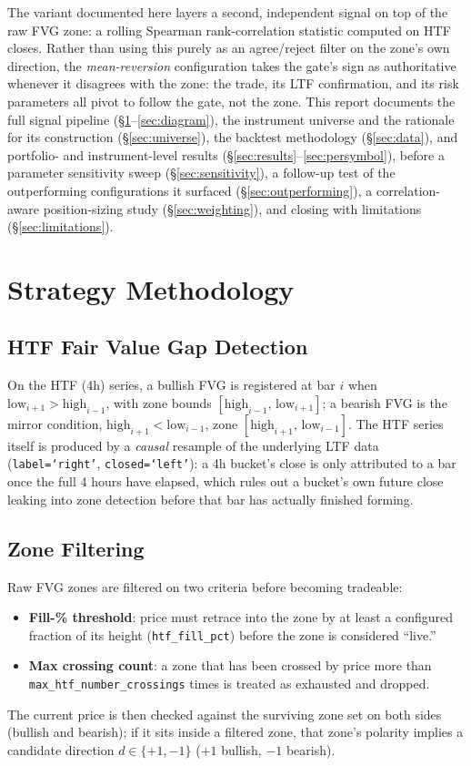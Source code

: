 \documentclass[11pt]{article}
\begin{document}
The variant documented here layers a second, independent signal on top of the raw FVG zone: a rolling
Spearman rank-correlation statistic computed on HTF closes. Rather than using this purely as an
agree/reject filter on the zone's own direction, the \emph{mean-reversion} configuration takes the
gate's sign as authoritative whenever it disagrees with the zone: the trade, its LTF confirmation, and
its risk parameters all pivot to follow the gate, not the zone. This report documents the full signal
pipeline (\S\ref{sec:methodology}--\ref{sec:diagram}), the instrument universe and the rationale for
its construction (\S\ref{sec:universe}), the backtest methodology (\S\ref{sec:data}), and portfolio-
and instrument-level results (\S\ref{sec:results}--\ref{sec:persymbol}), before a parameter sensitivity
sweep (\S\ref{sec:sensitivity}), a follow-up test of the outperforming configurations it surfaced
(\S\ref{sec:outperforming}), a correlation-aware position-sizing study (\S\ref{sec:weighting}), and
closing with limitations (\S\ref{sec:limitations}).

\section{Strategy Methodology}
\label{sec:methodology}

\subsection{HTF Fair Value Gap Detection}
On the HTF (4h) series, a bullish FVG is registered at bar $i$ when
$\mathrm{low}_{i+1} > \mathrm{high}_{i-1}$, with zone bounds $[\mathrm{high}_{i-1},\,\mathrm{low}_{i+1}]$;
a bearish FVG is the mirror condition, $\mathrm{high}_{i+1} < \mathrm{low}_{i-1}$, zone
$[\mathrm{high}_{i+1},\,\mathrm{low}_{i-1}]$. The HTF series itself is produced by a \emph{causal}
resample of the underlying LTF data (\texttt{label=`right'}, \texttt{closed=`left'}): a 4h bucket's
close is only attributed to a bar once the full 4 hours have elapsed, which rules out a bucket's own
future close leaking into zone detection before that bar has actually finished forming.

\subsection{Zone Filtering}
Raw FVG zones are filtered on two criteria before becoming tradeable:
\begin{itemize}[nosep]
  \item \textbf{Fill-\% threshold}: price must retrace into the zone by at least a configured
  fraction of its height (\texttt{htf\_fill\_pct}) before the zone is considered ``live.''
  \item \textbf{Max crossing count}: a zone that has been crossed by price more than
  \texttt{max\_htf\_number\_crossings} times is treated as exhausted and dropped.
\end{itemize}
The current price is then checked against the surviving zone set on both sides (bullish and bearish);
if it sits inside a filtered zone, that zone's polarity implies a candidate direction
$d\in\{+1,-1\}$ ($+1$ bullish, $-1$ bearish).
\end{document}
